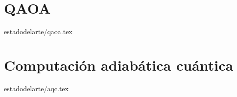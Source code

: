 \section{QAOA}{estadodelarte/qaoa.tex}

\section{Computación adiabática cuántica}{estadodelarte/aqc.tex}

